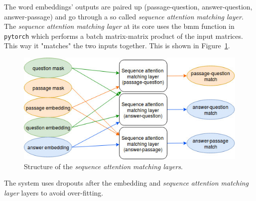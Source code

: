The word embeddings' outputs are paired up (passage-question, answer-question, answer-passage) and go through a so called \textit{sequence attention matching layer}.
The \textit{sequence attention matching layer} at its core uses the bmm function in \texttt{pytorch} which performs a batch matrix-matrix product of the input matrices.
This way it "matches" the two inputs together. This is shown in Figure~\ref{fig:attention_match}.
\begin{figure}[h!]
	\centering
	\includegraphics[scale=0.5]{TriAN_attention_match.jpg}
	\caption{Structure of the \textit{sequence attention matching layers}.}
	\label{fig:attention_match}
\end{figure}

The system uses dropouts after the embedding and \textit{sequence attention matching layer} layers to avoid over-fitting.

